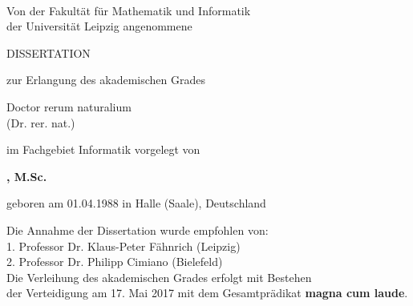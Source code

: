 
\renewcommand{\today}{\ifnum\number\day<10 0\fi \number\day.\space%
\ifcase \month \or Januar \or Februar \or März \or April \or Mai %
\or Juni \or Juli \or August \or September \or Oktober \or November \or Dezember \fi %
\number \year} 

\begin{titlepage}
	\begin{addmargin}[-1cm]{-3cm}
    \begin{center}
        \large  

        \hfill

        \vfill

        \begingroup
            \color{Maroon}\LARGE{\spacedallcaps{\myTitle}} \\ \bigskip
        \endgroup
        
    
        Von der Fakultät für Mathematik und Informatik\\
        der Universität Leipzig angenommene \\\vfill
        
        {\Huge DISSERTATION} \vfill\medskip
    
        zur Erlangung des akademischen Grades \\\vfill
        
        {\LARGE Doctor rerum naturalium}\\
        (Dr. rer. nat.)\\\vfill
        
        im Fachgebiet Informatik vorgelegt von\\\vfill
        
        \textbf{\myName, M.Sc.} \\\vfill
        
        geboren am 01.04.1988 in Halle (Saale), Deutschland \\\vfill
        
        Die Annahme der Dissertation wurde empfohlen von:\\\vfill
1. Professor Dr. Klaus-Peter Fähnrich (Leipzig)\\
2. Professor Dr. Philipp Cimiano (Bielefeld)\\\vfill
Die Verleihung des akademischen Grades erfolgt mit Bestehen\\
der Verteidigung am 17. Mai 2017 mit dem Gesamtprädikat \textbf{magna cum laude}.\\\vfill


\end{center}
\end{addmargin}
\end{titlepage}
